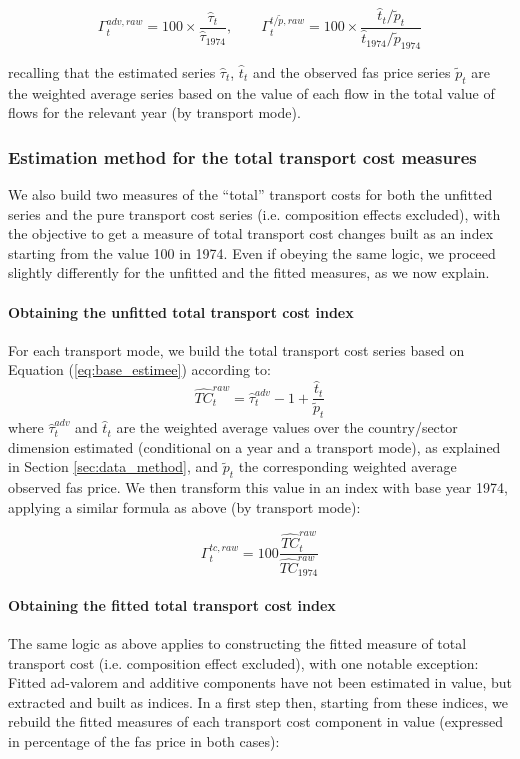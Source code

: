 \documentclass[a4paper,11pt]{article}
\begin{document}
$$\Gamma^{adv, raw}_t = 100\times\frac{\widehat{\tau}_t}{\widehat{\tau}_{1974}},\qquad \Gamma^{t/\widetilde{p}, raw}_t = 100\times\frac{\widehat{t}_t/\widetilde{p}_t}{\widehat{t}_{1974}/\widetilde{p}_{1974}}$$


\noindent recalling that the estimated series $\widehat{\tau}_t$, $\widehat{t}_t$ and the observed fas price series $\widetilde{p}_t$ are the weighted average series based on the value of each flow in the total value of flows for the relevant year (by transport mode).

\subsubsection{Estimation method for the total transport cost measures}

We also build two measures of the ``total'' transport costs for both the unfitted series and the pure transport cost series (i.e. composition effects excluded), with the objective to get a measure of total transport cost changes built as an index starting from the value 100 in 1974. Even if obeying the same logic, we proceed slightly differently for the unfitted and the fitted measures, as we now explain.
\smallskip

\paragraph{Obtaining the unfitted total transport cost index} For each transport mode, we build the total transport cost series based on Equation (\ref{eq:base_estimee}) according to:
$$\widehat{TC}^{raw}_t= \widehat{\tau}^{adv}_t -1 + \frac{\widehat{t}_t}{\widetilde{p}_t}$$
\noindent where $\widehat{\tau}^{adv}_t$ and $\widehat{t}_t$ are the weighted average values over the country/sector dimension estimated (conditional on a year and a transport mode), as explained in Section \ref{sec:data_method}, and $\widetilde{p}_t$ the corresponding weighted average observed fas price.
We then transform this value in an index with base year 1974, applying a similar formula as above (by transport mode):

$$\Gamma^{tc, raw}_t = 100\frac{\widehat{TC}^{raw}_t  }{\widehat{TC}^{raw}_{1974}}$$



\paragraph{Obtaining the fitted total transport cost index} The same logic as above applies to constructing the fitted measure of total transport cost (i.e. composition effect excluded), with one notable exception: Fitted ad-valorem and additive components have not been estimated in value, but extracted and built as indices. In a first step then, starting from these indices, we rebuild the fitted measures of each transport cost component in value (expressed in percentage of the fas price in both cases):
\end{document}

